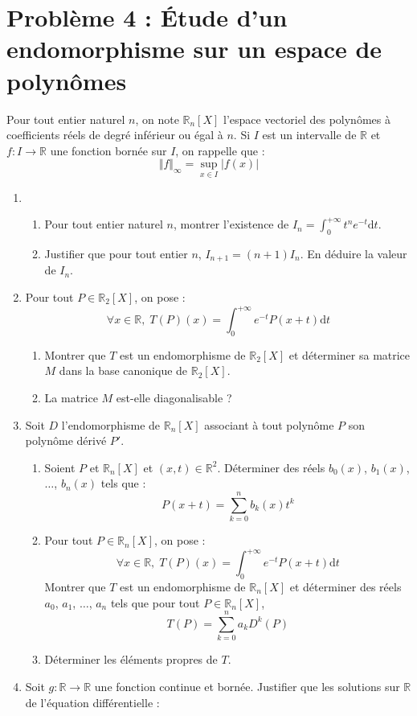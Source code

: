 \documentclass[twoside,french,11pt]{VcCours}
\newcommand{\dt}{\text{d}t}
\begin{document}
\section*{Problème 4 : Étude d'un endomorphisme sur un espace de polynômes}
  Pour tout entier naturel $n$, on note $\mathbb{R}_n[X]$ l'espace vectoriel des polynômes à coefficients réels de degré inférieur ou égal à $n$. Si $I$ est un intervalle de $\mathbb{R}$ et $f : I \rightarrow \mathbb{R}$ une fonction bornée sur $I$, on rappelle que :
  $$ \Vert f \Vert_{\infty} = \sup_{x \in I} \vert f(x) \vert$$
    \begin{enumerate}
  \item 
  \begin{enumerate}
  \item Pour tout entier naturel $n$, montrer l'existence de $I_n =  \int_0^{+ \infty} t^n e^{-t} \dt$.
  \item Justifier que pour tout entier $n$, $I_{n+1}=(n+1)I_n$. En déduire la valeur de $I_n$.
  \end{enumerate}
  \item Pour tout $P \in \mathbb{R}_2[X]$, on pose :
  $$ \forall x \in \mathbb{R}, \; T(P)(x) = \int_0^{+ \infty} e^{-t} P(x+t) \dt$$
  \begin{enumerate}
  \item Montrer que $T$ est un endomorphisme de $\mathbb{R}_2[X]$ et déterminer sa matrice $M$ dans la base canonique de $\mathbb{R}_2[X]$.
  \item La matrice $M$ est-elle diagonalisable ?
  \end{enumerate}
  \item Soit $D$ l'endomorphisme de $\mathbb{R}_n[X]$ associant à tout polynôme $P$ son polynôme dérivé $P'$.
  \begin{enumerate}
  \item Soient $P$ et $\mathbb{R}_n[X]$ et $(x,t) \in \mathbb{R}^2$. Déterminer des réels $b_0(x)$, $b_1(x)$, $\ldots$, $b_n(x)$ tels que :
  $$ P(x+t) = \sum_{k=0}^n b_k(x) t^k$$
  \item Pour tout $P \in \mathbb{R}_n[X]$, on pose :
  $$ \forall x \in \mathbb{R}, \; T(P)(x) = \int_0^{+ \infty} e^{-t} P(x+t) \dt$$
  Montrer que $T$ est un endomorphisme de $\mathbb{R}_n[X]$ et déterminer des réels $a_0$, $a_1$, $\ldots$, $a_n$ tels que pour tout $P \in \mathbb{R}_n[X]$,
  $$ T(P) = \sum_{k=0}^n a_k D^k(P)$$
  \item Déterminer les éléments propres de $T$.
  \end{enumerate}
  \item Soit $g : \mathbb{R} \rightarrow \mathbb{R}$ une fonction continue et bornée. Justifier que les solutions sur $\mathbb{R}$ de l'équation différentielle :

\end{enumerate}
\end{document}
